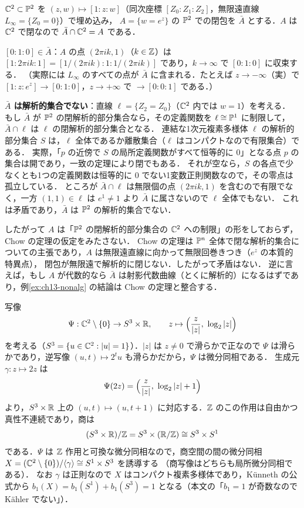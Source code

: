 $\mathbb{C}^2\subset\mathbb{P}^2$ を $(z,w)\mapsto[1:z:w]$（同次座標 $[Z_0:Z_1:Z_2]$，無限遠直線 $L_\infty=\{Z_0=0\}$）で埋め込み，
$A=\{w=e^z\}$ の $\mathbb{P}^2$ での閉包を $\bar A$ とする．$A$ は $\mathbb{C}^2$ で閉なので $\bar A\cap\mathbb{C}^2=A$ である．

\textbf{$[0:1:0]\in\bar A$}：$A$ の点 $(2\pi ik,1)$（$k\in\mathbb{Z}$）は $[1:2\pi ik:1]=[1/(2\pi ik):1:1/(2\pi ik)]$ であり，$k\to\infty$ で $[0:1:0]$ に収束する．
（実際には $L_\infty$ のすべての点が $\bar A$ に含まれる．たとえば $z\to-\infty$（実）で $[1:z:e^z]\to[0:1:0]$，$z\to+\infty$ で $\to[0:0:1]$ である．）

\textbf{$\bar A$ は解析的集合でない}：直線 $\ell=\{Z_2=Z_0\}$（$\mathbb{C}^2$ 内では $w=1$）を考える．
もし $\bar A$ が $\mathbb{P}^2$ の閉解析的部分集合なら，その定義関数を $\ell\cong\mathbb{P}^1$ に制限して，$\bar A\cap\ell$ は $\ell$ の閉解析的部分集合となる．
連結な1次元複素多様体 $\ell$ の解析的部分集合 $S$ は，$\ell$ 全体であるか離散集合（$\ell$ はコンパクトなので有限集合）である．
実際，「$p$ の近傍で $S$ の局所定義関数がすべて恒等的に $0$」となる点 $p$ の集合は開であり，一致の定理により閉でもある．
それが空なら，$S$ の各点で少なくとも1つの定義関数は恒等的に $0$ でない1変数正則関数なので，その零点は孤立している．
ところが $\bar A\cap\ell$ は無限個の点 $(2\pi ik,1)$ を含むので有限でなく，一方 $(1,1)\in\ell$ は $e^1\neq1$ より $\bar A$ に属さないので $\ell$ 全体でもない．
これは矛盾であり，$\bar A$ は $\mathbb{P}^2$ の解析的集合でない．

したがって $A$ は「$\mathbb{P}^2$ の閉解析的部分集合の $\mathbb{C}^2$ への制限」の形をしておらず，Chow の定理の仮定をみたさない．
Chow の定理は $\mathbb{P}^n$ 全体で閉な解析的集合についての主張であり，$A$ は無限遠直線に向かって無限回巻きつき（$e^z$ の本質的特異点），
閉包が無限遠で解析的に閉じない．したがって矛盾はない．
逆に言えば，もし $A$ が代数的なら $\bar A$ は射影代数曲線（とくに解析的）になるはずであり，例\ref{ex:ch13-nonalg} の結論は Chow の定理と整合する．

写像
\begin{equation*}
  \Psi:\C^2\setminus\{0\}\to S^3\times\R,\qquad z\mapsto\Bigl(\frac{z}{|z|},\ \log_2|z|\Bigr)
\end{equation*}
を考える（$S^3=\{u\in\mathbb{C}^2:|u|=1\}$）．$|z|$ は $z\neq0$ で滑らかで正なので $\Psi$ は滑らかであり，逆写像 $(u,t)\mapsto 2^tu$ も滑らかだから，$\Psi$ は微分同相である．
生成元 $\gamma:z\mapsto2z$ は
\begin{equation*}
  \Psi(2z) = \Bigl(\frac{z}{|z|},\ \log_2|z|+1\Bigr)
\end{equation*}
より，$S^3\times\mathbb{R}$ 上の $(u,t)\mapsto(u,t+1)$ に対応する．$\mathbb{Z}$ のこの作用は自由かつ真性不連続であり，商は
\begin{equation*}
  (S^3\times\mathbb{R})/\mathbb{Z} = S^3\times(\mathbb{R}/\mathbb{Z})\cong S^3\times S^1
\end{equation*}
である．$\Psi$ は $\mathbb{Z}$ 作用と可換な微分同相なので，商空間の間の微分同相 $X=(\mathbb{C}^2\setminus\{0\})/\langle\gamma\rangle\cong S^1\times S^3$ を誘導する
（商写像はどちらも局所微分同相である）．
なお $\gamma$ は正則なので $X$ はコンパクト複素多様体であり，Künneth の公式から $b_1(X)=b_1(S^1)+b_1(S^3)=1$ となる（本文の「$b_1=1$ が奇数なので Kähler でない」）．

